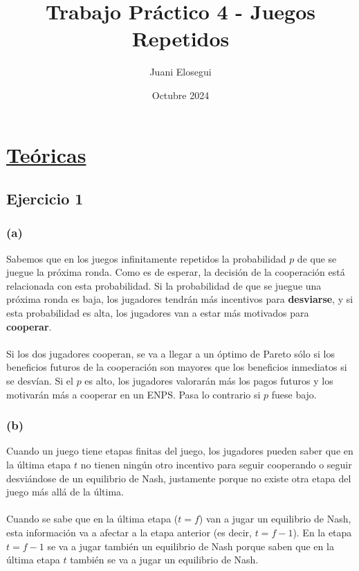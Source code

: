 \documentclass{article}
\title{Trabajo Práctico 4 - Juegos Repetidos}
\author{Juani Elosegui}
\date{Octubre 2024}
\begin{document}
    \maketitle

    \newpage

    \section*{\underline{\textbf{Teóricas}}}
        \subsection*{Ejercicio 1}
            \subsubsection*{(a)}
                Sabemos que en los juegos infinitamente repetidos la probabilidad $p$ de que se juegue la próxima ronda. Como es de esperar, la decisión de la cooperación está relacionada con esta probabilidad. Si la probabilidad de que se juegue una próxima ronda es baja, los jugadores tendrán más incentivos para \textbf{desviarse}, y si esta probabilidad es alta, los jugadores van a estar más motivados para \textbf{cooperar}.
                \\
                \\
                Si los dos jugadores cooperan, se va a llegar a un óptimo de Pareto sólo si los beneficios futuros de la cooperación son mayores que los beneficios inmediatos si se desvían. Si el $p$ es alto, los jugadores valorarán más los pagos futuros y los motivarán más a cooperar en un ENPS. Pasa lo contrario si $p$ fuese bajo.
            \subsubsection*{(b)}
                Cuando un juego tiene etapas finitas del juego, los jugadores pueden saber que en la última etapa $t$ no tienen ningún otro incentivo para seguir cooperando o seguir desviándose de un equilibrio de Nash, justamente porque no existe otra etapa del juego más allá de la última.
                \\
                \\
                Cuando se sabe que en la última etapa ($t = f$) van a jugar un equilibrio de Nash, esta información va a afectar a la etapa anterior (es decir, $t=f-1$). En la etapa $t=f-1$ se va a jugar también un equilibrio de Nash porque saben que en la última etapa $t$ también se va a jugar un equilibrio de Nash.
                
\end{document}
